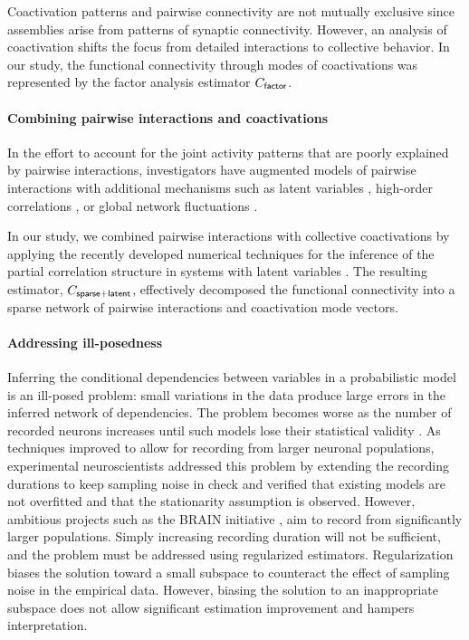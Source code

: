 \documentclass[10pt]{article}
\begin{document}
Coactivation patterns and pairwise connectivity are not mutually exclusive since assemblies arise from patterns of synaptic connectivity.  However, an analysis of coactivation shifts the focus from detailed interactions to  collective behavior.  
In our study, the functional connectivity through modes of coactivations was represented by the factor analysis estimator $C_{\sf factor}$.  

\paragraph{Combining pairwise interactions and coactivations}
In the effort to account for the joint activity patterns that are poorly explained by pairwise interactions, investigators have augmented models of pairwise interactions with additional mechanisms such as latent variables \cite{Koster:2013},  high-order correlations \cite{Ganmor:2011}, or global network fluctuations \cite{Tkacik:2013}.

In our study, we combined pairwise interactions with collective coactivations by applying the recently developed numerical techniques for the inference of the partial correlation structure in systems with latent variables \cite{Chandrasekaran:2010, Ma:2013}.  The resulting estimator, $C_{\sf sparse+latent}$, effectively decomposed the functional connectivity into a sparse network of pairwise interactions and coactivation mode vectors.

\paragraph{Addressing ill-posedness}
Inferring the conditional dependencies between variables in a probabilistic model is an ill-posed problem: small variations in the data produce large errors in the inferred network of dependencies. The problem becomes worse as the number of  recorded neurons increases until such models lose their statistical validity \cite{Roudi:2009}.  As  techniques improved to allow for recording from larger neuronal populations, experimental neuroscientists addressed this problem by extending the recording durations to keep sampling noise in check and verified that existing models are not overfitted and that the stationarity assumption is observed\cite{Tkacik:2013}. However,  ambitious projects such as the BRAIN initiative  \cite{Alivisatos:2013}, aim to record from significantly larger populations. Simply increasing recording duration will not be sufficient, and the problem must be addressed using regularized estimators. Regularization biases the solution toward a small subspace to counteract the effect of  sampling noise in the empirical data. However, biasing the solution to an inappropriate subspace does not allow significant estimation improvement and hampers interpretation.
\end{document}
